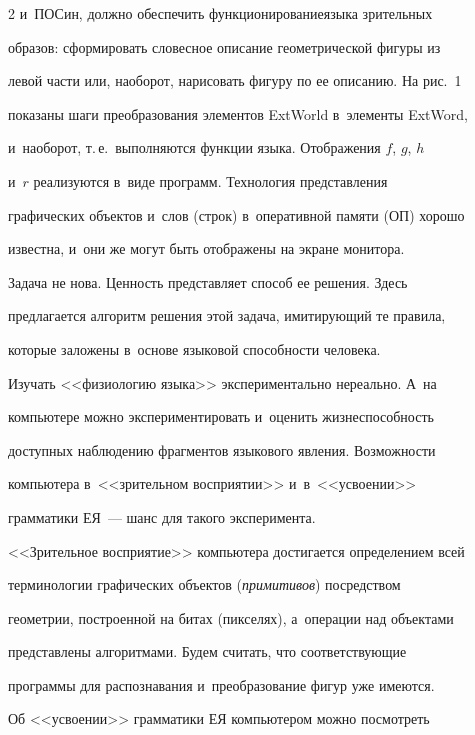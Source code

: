 \begin{multicols}{2}
и~\mbox{ПОСин}, должно обеспечить функционирование\linebreak языка зрительных 

образов: сформировать словесное описание гео\-мет\-ри\-че\-ской фигуры из 

левой час\-ти или, наоборот, нарисовать фигуру по ее описанию. На рис.~1 

показаны шаги преобразования \mbox{элементов} ExtWorld в~элементы ExtWord, 

и~наоборот, т.\,е.\ выполняются функции языка. Отображения $f$, $g$, $h$ 

и~$r$ реализуются в~виде программ. Технология пред\-став\-ле\-ния 

графических объектов и~слов (строк) в~оперативной памяти (ОП) хорошо 

известна, и~они же могут быть отображены на экране монитора. 

  

  Задача не нова. Ценность представляет способ ее решения. Здесь 

предлагается алгоритм решения этой задача, ими\-ти\-ру\-ющий те правила, 

которые заложены в~основе языковой спо\-соб\-ности человека. 

  

  Изучать <<физиологию языка>> экспериментально нереально. А~на 

компьютере можно экспериментировать и~оценить жиз\-не\-спо\-соб\-ность 

до\-ступ\-ных наблюдению фрагментов языкового явления. Возможности 

компьютера в~<<зрительном восприятии>> и~в~<<усво\-ении>> 

грамматики ЕЯ~--- шанс для такого эксперимента.

  

  <<Зрительное восприятие>> компьютера достигается определением всей 

терминологии графических объектов (\textit{примитивов}) по\-сред\-ст\-вом 

геометрии, по\-стро\-ен\-ной на битах (пикселях), а~операции над объектами 

пред\-став\-ле\-ны алгоритмами. Будем считать, что со\-от\-вет\-ст\-ву\-ющие 

программы для распознавания и~преобразование фигур уже имеются.

  

  Об <<усвоении>> грамматики ЕЯ компьютером мож\-но посмотреть 


\end{multicols}
